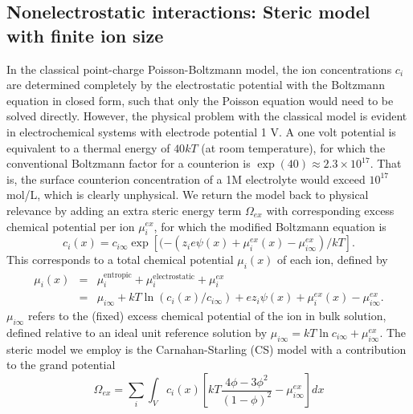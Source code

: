 \subsection{Nonelectrostatic interactions: Steric model with  finite ion size}

 In the classical point-charge Poisson-Boltzmann model, the
ion concentrations $c_i$ are determined completely by the
electrostatic potential with the Boltzmann equation in closed form,
such that
only the Poisson equation would need to be solved directly. However, the
physical problem with the classical model is evident in electrochemical
systems with electrode potential 1 V. A one volt potential is
equivalent to a thermal energy of $40 kT$ (at room temperature), for which the conventional
Boltzmann factor for a counterion is
$\exp(40)\approx 2.3 \times 10^{17}$.  That is, the surface counterion
concentration of a 1M electrolyte would exceed $10^{17}$ mol/L, which
is clearly unphysical.  We return the model back to physical
relevance by adding an extra steric energy term $\Omega_{ex}$ with
corresponding excess chemical potential per ion $\mu_{i}^{ex}$, for
which the modified Boltzmann equation is
\begin{equation}
    c_i(x)=c_{i\infty}\exp\left[(-(z_i e \psi(x) + \mu_i^{ex}(x)-\mu_{i\infty}^{ex})/kT\right].
    \label{general_Boltzmann}
\end{equation}
This corresponds to a total chemical potential $\mu_i(x)$ of each ion,
defined by
\begin{eqnarray}
  \mu_i(x) &=& \mu_{i}^{\textrm{entropic}} +  \mu_{i}^{\textrm{electrostatic}} +
               \mu_{i}^{ex} \\
{} &  =&\mu_{i\infty} + kT \ln(c_i(x)/c_{i\infty})
         + ez_i \psi(x) + \mu_i^{ex}(x)-\mu_{i\infty}^{ex}.
         \label{chem_pot}
\end{eqnarray}
$\mu_{i\infty}$ refers to the (fixed) excess chemical potential of the
ion in bulk solution, defined relative to an ideal unit
reference solution by $\mu_{i\infty} = kT\ln c_{i\infty} + \mu_{i\infty}^{ex}$.
The steric model we employ is the Carnahan-Starling (CS) model
\citep{CarnahanStarling1969} with a contribution to the grand potential
\begin{equation}
    \Omega_{ex} = \sum_{i} \int_{V} c_{i}(x) \left[ kT
    \frac{4\phi - 3\phi^2}{(1-\phi)^2}
    -  \mu_{i\infty}^{ex}
  \right]dx
  \label{CS_energy_functional}
\end{equation}
